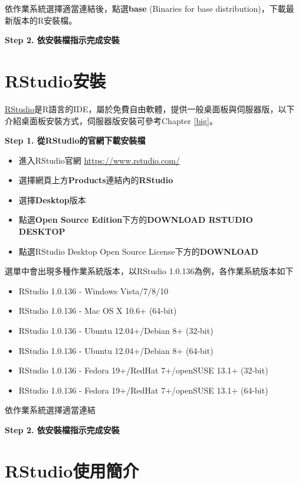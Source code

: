 \documentclass[]{book}
\providecommand{\tightlist}{%
  \setlength{\itemsep}{0pt}\setlength{\parskip}{0pt}}
\theoremstyle{definition}
\theoremstyle{definition}
\theoremstyle{remark}
\begin{document}
依作業系統選擇適當連結後，點選\textbf{base} (Binaries for base
distribution)，下載最新版本的R安裝檔。

\textbf{Step 2. 依安裝檔指示完成安裝}

\section{RStudio安裝}\label{rstudio}

\href{https://www.rstudio.com/}{RStudio}是R語言的IDE，屬於免費自由軟體，提供一般桌面板與伺服器版，以下介紹桌面板安裝方式，伺服器版安裝可參考Chapter
\ref{big}。

\textbf{Step 1. 從RStudio的官網下載安裝檔}

\begin{itemize}
\tightlist
\item
  進入RStudio官網 \url{https://www.rstudio.com/}
\item
  選擇網頁上方\textbf{Products}連結內的\textbf{RStudio}
\item
  選擇\textbf{Desktop}版本
\item
  點選\textbf{Open Source Edition}下方的\textbf{DOWNLOAD RSTUDIO
  DESKTOP}
\item
  點選RStudio Desktop Open Source License下方的\textbf{DOWNLOAD}
\end{itemize}

選單中會出現多種作業系統版本，以RStudio 1.0.136為例，各作業系統版本如下

\begin{itemize}
\tightlist
\item
  RStudio 1.0.136 - Windows Vista/7/8/10\\
\item
  RStudio 1.0.136 - Mac OS X 10.6+ (64-bit)
\item
  RStudio 1.0.136 - Ubuntu 12.04+/Debian 8+ (32-bit)
\item
  RStudio 1.0.136 - Ubuntu 12.04+/Debian 8+ (64-bit)
\item
  RStudio 1.0.136 - Fedora 19+/RedHat 7+/openSUSE 13.1+ (32-bit)
\item
  RStudio 1.0.136 - Fedora 19+/RedHat 7+/openSUSE 13.1+ (64-bit)
\end{itemize}

依作業系統選擇適當連結

\textbf{Step 2. 依安裝檔指示完成安裝}

\section{RStudio使用簡介}\label{rstudio}
\end{document}
